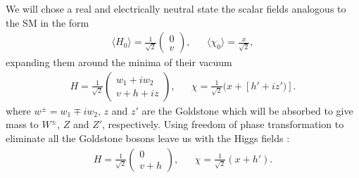 \documentclass{report}
\numberwithin{equation}{section}
\begin{document}
 We will chose a real and electrically neutral state the scalar fields analogous to the SM in the form 
\begin{align}
\langle H_0 \rangle =\frac{1}{\sqrt{2}}\begin{pmatrix}
0\\ v
\end{pmatrix},&& \langle \chi_0 \rangle =\frac{x}{\sqrt{2}},
\end{align}
expanding them around the minima of their vacuum
\begin{align}
H=\frac{1}{\sqrt{2}}\begin{pmatrix}
w_1+ iw_2\\
v +h + i z
\end{pmatrix},&&\chi=\frac{1}{\sqrt{2}}(x+[h'+iz')] .
\end{align}
where $w^\pm=w_1\mp iw_2$, $z$ and $z'$ are the Goldstone which will be absorbed to give mass to $W^\pm$, $Z$ and $Z'$, respectively. Using freedom of phase transformation to eliminate all the Goldstone bosons leave us with the Higgs fields :
\begin{align}
H=\frac{1}{\sqrt{2}}\begin{pmatrix}
0\\
v +h
\end{pmatrix},&&\chi=\frac{1}{\sqrt{2}}(x+h') .
\end{align}
\end{document}
